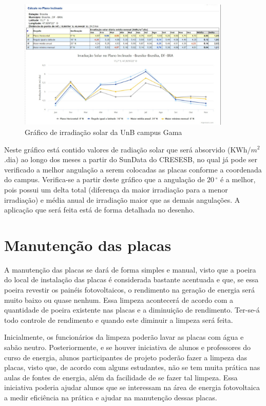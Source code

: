 \begin{figure}[h]
\centering
\includegraphics[width=0.9\textwidth]{figuras/planoinclinado.png}
\caption{Gráfico de irradiação solar da UnB campus Gama}
\end{figure}

Neste gráfico está contido valores de radiação solar que será absorvido (KWh/$m^2$.dia) ao longo dos meses a partir do SunData do CRESESB, no qual já pode ser verificado a melhor angulação a serem colocadas as placas conforme a coordenada do campus. Verifica-se a partir deste gráfico que a angulação de $20\,^{\circ}$ é a melhor, pois possui um delta total  (diferença da maior irradiação para a menor irradiação) e média anual de irradiação maior que as demais angulações. A aplicação que será feita está de forma detalhada no desenho.

\section{Manutenção das placas}

A manutenção das placas se dará de forma simples e manual, visto que a poeira do local de instalação das placas é considerada bastante acentuada e que, se essa poeira revestir os painéis fotovoltaicos, o rendimento na geração de energia será muito baixo ou quase nenhum. Essa limpeza acontecerá de acordo com a quantidade de poeira existente nas placas e a diminuição de rendimento. Ter-se-á todo controle de rendimento e quando este diminuir a limpeza será feita. 
\par Inicialmente, os funcionários da limpeza poderão lavar as placas com água e sabão neutro. Posteriormente, e se houver iniciativa de alunos e professores do curso de energia, alunos participantes de projeto poderão fazer a limpeza das placas, visto que, de acordo com alguns estudantes, não se tem muita prática nas aulas de fontes de energia, além da facilidade de se fazer tal limpeza. Essa iniciativa poderia ajudar alunos que se interessam na área de energia fotovoltaica a medir eficiência na prática e ajudar na manutenção dessas placas.

